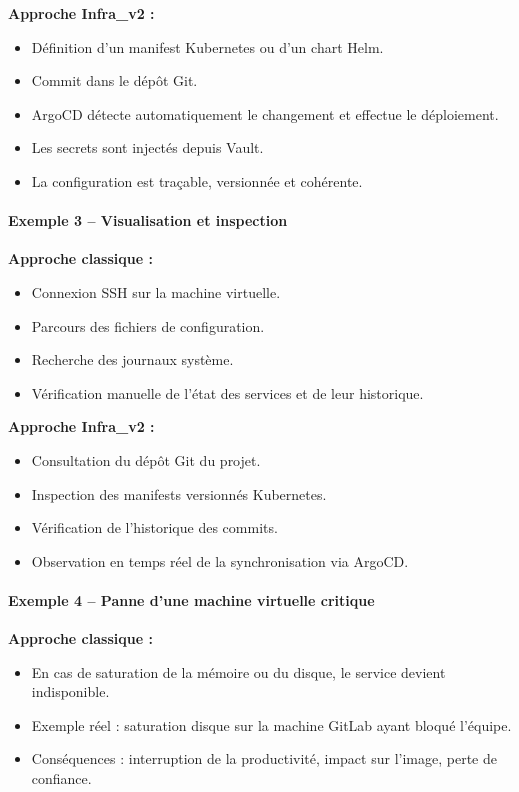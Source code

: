 \textbf{Approche Infra\_v2 :}
\begin{itemize}
	\item Définition d’un manifest Kubernetes ou d’un chart Helm.
	\item Commit dans le dépôt Git.
	\item ArgoCD détecte automatiquement le changement et effectue le déploiement.
	\item Les secrets sont injectés depuis Vault.
	\item La configuration est traçable, versionnée et cohérente.
\end{itemize}

\paragraph{Exemple 3 -- Visualisation et inspection}

\textbf{Approche classique :}
\begin{itemize}
	\item Connexion SSH sur la machine virtuelle.
	\item Parcours des fichiers de configuration.
	\item Recherche des journaux système.
	\item Vérification manuelle de l’état des services et de leur historique.
\end{itemize}

\textbf{Approche Infra\_v2 :}
\begin{itemize}
	\item Consultation du dépôt Git du projet.
	\item Inspection des manifests versionnés Kubernetes.
	\item Vérification de l’historique des commits.
	\item Observation en temps réel de la synchronisation via ArgoCD.
\end{itemize}

\paragraph{Exemple 4 -- Panne d’une machine virtuelle critique}

\textbf{Approche classique :}
\begin{itemize}
	\item En cas de saturation de la mémoire ou du disque, le service devient indisponible.
	\item Exemple réel : saturation disque sur la machine GitLab ayant bloqué l’équipe.
	\item Conséquences : interruption de la productivité, impact sur l’image, perte de confiance.
\end{itemize}

